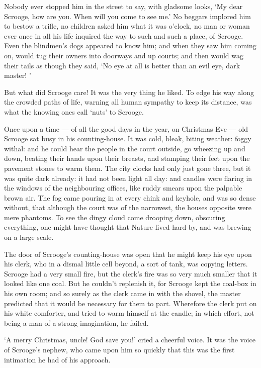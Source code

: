 \documentclass[11pt,twoside]{article}\makeatletter
\begin{document}
Nobody ever stopped him in the street to say, with gladsome looks, ‘My dear Scrooge, how are you. When will you come to see me.’ No beggars implored him to bestow a trifle, no children asked him what it was o'clock, no man or woman ever once in all his life inquired the way to such and such a place, of Scrooge. Even the blindmen's dogs appeared to know him; and when they saw him coming on, would tug their owners into doorways  and up courts; and then would wag their tails as though they said, ‘No eye at all is better than an evil eye, dark master! ’\par
But what did Scrooge care! It was the very thing he liked. To edge his way along the crowded paths of life, warning all human sympathy to keep its distance, was what the knowing ones call ‘nuts’ to Scrooge.\par
Once upon a time — of all the good days in the year, on Christmas Eve — old Scrooge sat busy in his counting-house. It was cold, bleak, biting weather: foggy withal: and he could hear the people in the court outside, go wheezing up and down, beating their hands upon their breasts, and stamping their feet upon the pavement stones to warm them. The city clocks had only just gone three, but it was quite dark already: it had not been light all day: and candles were flaring in the windows of the neighbouring offices, like ruddy smears upon the palpable brown air. The fog came pouring in at every chink and keyhole, and was so dense without, that although the court was of the  narrowest, the houses opposite were mere phantoms. To see the dingy cloud come drooping down, obscuring everything, one might have thought that Nature lived hard by, and was brewing on a large scale.\par
The door of Scrooge's counting-house was open that he might keep his eye upon his clerk, who in a dismal little cell beyond, a sort of tank, was copying letters. Scrooge had a very small fire, but the clerk's fire was so very much smaller that it looked like one coal. But he couldn't replenish it, for Scrooge kept the coal-box in his own room; and so surely as the clerk came in with the shovel, the master predicted that it would be necessary for them to part. Wherefore the clerk put on his white comforter, and tried to warm himself at the candle; in which effort, not being a man of a strong imagination, he failed. \par
‘A merry Christmas, uncle! God save you!’ cried a cheerful voice. It was the voice of Scrooge's nephew, who came upon him so quickly that this was the first intimation he had of his approach. \par
\end{document}
